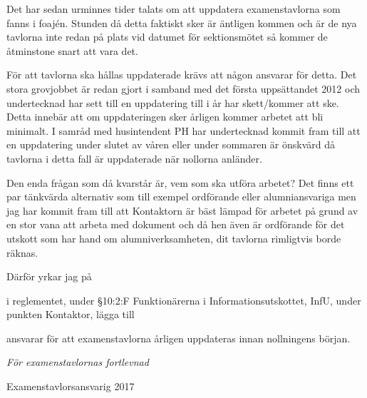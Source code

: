 \documentclass[../_main/handlingar.tex]{subfiles}
\begin{document}

Det har sedan urminnes tider talats om att uppdatera examenstavlorna som fanns i foajén. Stunden då detta faktiskt sker är äntligen kommen och är de nya tavlorna inte redan på plats vid datumet för sektionsmötet så kommer de åtminstone snart att vara det.

För att tavlorna ska hållas uppdaterade krävs att någon ansvarar för detta. Det stora grovjobbet är redan gjort i samband med det första uppsättandet 2012 och undertecknad har sett till en uppdatering till i år har skett/kommer att ske. Detta innebär att om uppdateringen sker årligen kommer arbetet att bli minimalt. I samråd med husintendent PH har undertecknad kommit fram till att en uppdatering under slutet av våren eller under sommaren är önskvärd då tavlorna i detta fall är uppdaterade när nollorna anländer.

Den enda frågan som då kvarstår är, vem som ska utföra arbetet? Det finns ett par tänkvärda alternativ som till exempel ordförande eller alumniansvariga men jag har kommit fram till att Kontaktorn är bäst lämpad för arbetet på grund av en stor vana att arbeta med dokument och då hen även är ordförande för det utskott som har hand om alumniverksamheten, dit tavlorna rimligtvis borde räknas.

Därför yrkar jag på
\begin{attsatser}
    \att i reglementet, under \S10:2:F Funktionärerna i Informationsutskottet, InfU, under punkten Kontaktor, lägga till
    \begin{itshape}
        \begin{itemizedash}
            \item ansvarar för att examenstavlorna årligen uppdateras innan nollningens början.
        \end{itemizedash}
    \end{itshape}

   \end{attsatser}

\begin{signatures}{1}
    \emph{För examenstavlornas fortlevnad}
    \signature{Fredrik Peterson}{Examenstavlorsansvarig 2017}
\end{signatures}
\end{document}
